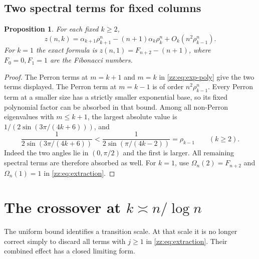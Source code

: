 \documentclass[11pt,a4paper]{article}
\newtheorem{proposition}[theorem]{Proposition}
\theoremstyle{definition}
\newcommand{\Om}{\Omega}
\begin{document}
\subsection{Two spectral terms for fixed columns}
\begin{proposition}
\label{zz:prop:two-term}
For each fixed $k\ge2$,
\begin{equation}\label{zz:eq:two-term}
 z(n,k)=\alpha_{k+1}\rho_{k+1}^{n}
 -(n+1)\alpha_k\rho_k^n
 +O_k(n^2\rho_{k-1}^n).
\end{equation}
For $k=1$ the exact formula is
$z(n,1)=F_{n+2}-(n+1)$, where $F_0=0,F_1=1$ are the Fibonacci numbers.
\end{proposition}
\begin{proof}
The Perron terms at $m=k+1$ and $m=k$ in \eqref{zz:eq:exp-poly} give the two
terms displayed.  The Perron term at $m=k-1$ is of order
$n^2\rho_{k-1}^n$.  Every Perron term at a smaller size has a strictly smaller
exponential base, so its fixed polynomial factor can be absorbed in that
bound.  Among all non-Perron eigenvalues with $m\le k+1$, the largest
absolute value is $1/(2\sin(3\pi/(4k+6)))$, and
\[
 \frac1{2\sin(3\pi/(4k+6))}
 <\frac1{2\sin(\pi/(4k-2))}=\rho_{k-1}
 \qquad(k\ge2).
\]
Indeed the two angles lie in $(0,\pi/2)$ and the first is larger.
All remaining spectral terms are therefore absorbed as well.
For $k=1$, use $\Om_n(2)=F_{n+2}$ and $\Om_n(1)=1$ in
\eqref{zz:eq:extraction}.
\end{proof}

\section{The crossover at \texorpdfstring{$k\asymp n/\log n$}{k of order n/log n}}
\label{zz:sec:crossover}
The uniform bound identifies a transition scale.  At that scale it is no
longer correct simply to discard all terms with $j\ge1$ in
\eqref{zz:eq:extraction}.  Their combined effect has a closed limiting form.
\end{document}
